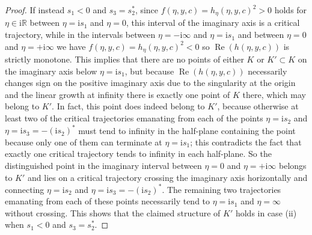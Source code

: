 \begin{proof}
If instead $s_1<0$ and $s_3=s_2^*$, since $f(\eta,y,c)=h_\eta(\eta,y,c)^2>0$ holds for $\eta\in \mathrm{i} \mathbb{R}$ between $\eta=\mathrm{i} s_1$ and $\eta=0$, this interval of the imaginary axis is a critical trajectory, while in the intervals between $\eta=-\mathrm{i}\infty$ and $\eta=\mathrm{i} s_1$ and between $\eta=0$ and $\eta=+\mathrm{i}\infty$ we have $f(\eta,y,c)=h_\eta(\eta,y,c)^2<0$ so $\operatorname{Re}(h(\eta,y,c))$ is strictly monotone. This implies that there are no points of either $K$ or $K'\subset K$ on the imaginary axis below $\eta=\mathrm{i} s_1$, but because $\operatorname{Re}(h(\eta,y,c))$ necessarily changes sign on the positive imaginary axis due to the singularity at the origin and the linear growth at infinity there is exactly one point of $K$ there, which may belong to $K'$. In fact, this point does indeed belong to $K'$, because otherwise at least two of the critical trajectories emanating from each of the points $\eta=\mathrm{i} s_2$ and $\eta=\mathrm{i} s_3=-(\mathrm{i} s_2)^*$ must tend to infinity in the half-plane containing the point because only one of them can terminate at $\eta=\mathrm{i} s_1$; this contradicts the fact that exactly one critical trajectory tends to infinity in each half-plane. So the distinguished point in the imaginary interval between $\eta=0$ and $\eta=+\mathrm{i}\infty$ belongs to $K'$ and lies on a critical trajectory crossing the imaginary axis horizontally and connecting $\eta=\mathrm{i} s_2$ and $\eta=\mathrm{i} s_3=-(\mathrm{i} s_2)^*$. The remaining two trajectories emanating from each of these points necessarily tend to $\eta=\mathrm{i} s_1$ and $\eta=\infty$ without crossing. This shows that the claimed structure of $K'$ holds in case (ii) when $s_1<0$ and $s_3=s_2^*$.


\end{proof}
